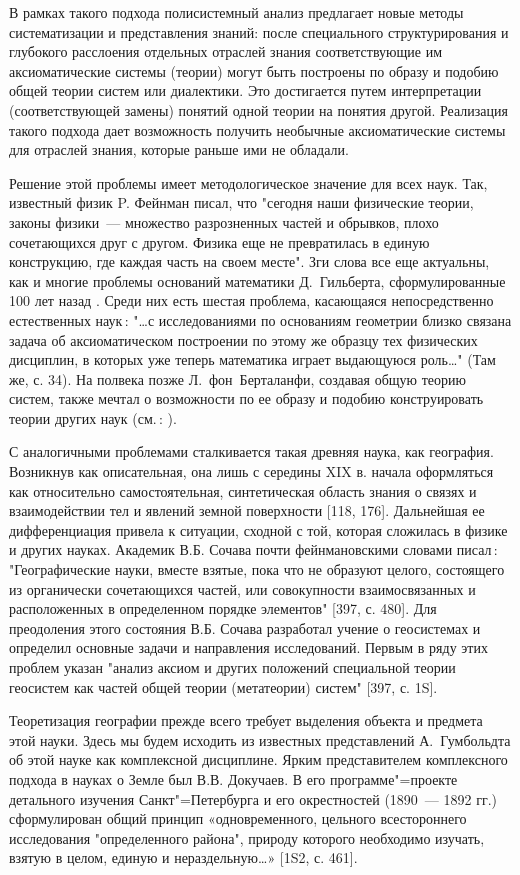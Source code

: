 \documentclass[draft,openany,14pt]{extbook}
\begin{document}
В рамках такого подхода полисистемный анализ предлагает новые методы систематизации и представления знаний: после специального структурирования и глубокого расслоения отдельных отраслей знания соответствующие им аксиоматические системы (теории) могут быть построены по образу и подобию общей теории систем или диалектики. Это достигается путем интерпретации (соответствующей замены) понятий одной теории на понятия другой. Реализация такого подхода дает возможность получить необычные аксиоматические системы для отраслей знания, которые раньше ими не обладали.

Решение этой проблемы имеет методологическое значение для всех наук. Так, известный физик P. Фейнман \cite{b437} писал, что "сегодня наши физические теории, законы физики~--- множество разрозненных частей и обрывков, плохо сочетающихся друг с другом.  Физика еще не превратилась в единую конструкцию, где каждая часть на своем месте". Зги слова все еще актуальны, как и многие проблемы оснований математики Д.~Гильберта, сформулированные 100 лет назад \cite{b347}. Среди них есть шестая проблема, касающаяся непосредственно естественных наук\,: "\ldots{}с исследованиями по основаниям геометрии близко связана задача об аксиоматическом построении по этому же образцу тех физических дисциплин, в которых уже теперь математика играет выдающуюся роль\ldots{}" (Там же, с. 34). На полвека позже Л.~фон~Берталанфи, создавая общую теорию систем, также мечтал о возможности по ее образу и подобию конструировать теории других наук (см.\,: \cite{b367}).

С аналогичными проблемами сталкивается такая древняя наука, как география. Возникнув как описательная, она лишь с середины XIX в. начала оформляться как относительно самостоятельная, синтетическая область знания о связях и взаимодействии тел и явлений земной поверхности [118, 176]. Дальнейшая ее дифференциация привела к ситуации, сходной с той, которая сложилась в физике и других науках. Академик В.Б. Сочава почти фейнмановскими словами писал\,: "Географические науки, вместе взятые, пока что не образуют целого, состоящего из органически сочетающихся частей, или совокупности взаимосвязанных и расположенных в определенном порядке элементов" [397, с. 480]. Для преодоления этого состояния В.Б. Сочава разработал учение о геосистемах и определил основные задачи и направления исследований. Первым в ряду этих проблем указан "анализ аксиом и других положений специальной теории геосистем как частей общей теории (метатеории) систем" [397, с. 1S].

Теоретизация географии прежде всего требует выделения объекта и предмета этой науки. Здесь мы будем исходить из известных представлений А.~Гумбольдта об этой науке как комплексной дисциплине. Ярким представителем комплексного подхода в науках о Земле был В.В. Докучаев. В его программе"=проекте детального изучения Санкт"=Петербурга и его окрестностей (1890~--- 1892 гг.) сформулирован общий принцип «одновременного, цельного всестороннего исследования "определенного района", природу которого необходимо изучать, взятую в целом, единую и нераздельную\ldots{}» [1S2, с. 461].
\end{document}
